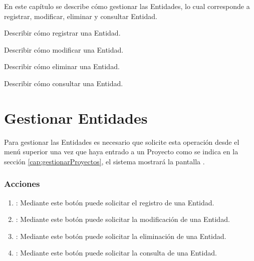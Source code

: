 
En este capítulo se describe cómo gestionar las Entidades, lo cual corresponde a registrar, modificar, eliminar y
consultar Entidad.\\


\begin{objetivos}
	\item Describir cómo registrar una Entidad.
	\item Describir cómo modificar una Entidad.
	\item Describir cómo eliminar una Entidad.
	\item Describir cómo consultar una Entidad.
\end{objetivos}

\section{Gestionar Entidades}

Para gestionar las Entidades es necesario que solicite esta operación desde el menú superior una vez que haya entrado a un Proyecto como se indica en la sección \ref{cap:gestionarProyectos}, el sistema mostrará la pantalla .


\subsubsection{Acciones}

\begin{enumerate}
	\item {}: Mediante este botón puede solicitar el registro de una Entidad.
	\item {}: Mediante este botón puede solicitar la modificación de una Entidad.
	\item {}: Mediante este botón puede solicitar la eliminación de una Entidad.
	\item {}: Mediante este botón puede solicitar la consulta de una Entidad.
\end{enumerate}






